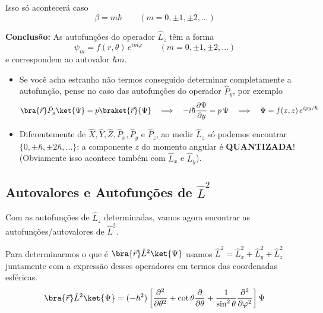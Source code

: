 Isso só acontecerá caso
\begin{equation}
    \beta = m\hbar \qquad (m = 0, \pm 1, \pm 2, \dots)
\label{eq:aula19_beta_quantizado}
\end{equation}

\textbf{Conclusão:} As autofunções do operador $\hat{L}_z$ têm a forma
\begin{equation}
    \boxed{\psi_m = f(r,\theta) \, e^{im\varphi} \qquad (m = 0, \pm 1, \pm 2, \dots)}
\label{eq:aula19_autofuncoes_Lz}
\end{equation}
e correspondem ao autovalor $\boxed{\hbar m}$.

\begin{itemize}
    \item Se você acha estranho não termos conseguido determinar completamente a autofunção, pense no caso das autofunções do operador $\hat{P}_y$, por exemplo
    \begin{equation}
        \bra{\vec{r}}\hat{P}_y\ket{\Psi} = p\braket{\vec{r}}{\Psi}
        \quad \Longrightarrow \quad
        -i\hbar \frac{\partial \Psi}{\partial y} = p\,\Psi
        \quad \Longrightarrow \quad
        \Psi = f(x,z)\, e^{ipy/\hbar}
    \label{eq:aula19_Py_autofuncao}
    \end{equation}
    \item Diferentemente de $\hat{X}, \hat{Y}, \hat{Z}, \hat{P}_x, \hat{P}_y$ e $\hat{P}_z$, ao medir $\hat{L}_z$ só podemos encontrar $\{0, \pm\hbar, \pm2\hbar, \dots\}$: a componente $z$ do momento angular é \textbf{QUANTIZADA}! (Obviamente isso acontece também com $\hat{L}_x$ e $\hat{L}_y$).
\end{itemize}

\subsection*{Autovalores e Autofunções de $\hat{L}^2$}

Com as autofunções de $\hat{L}_z$ determinadas, vamos agora encontrar as autofunções/autovalores de $\hat{L}^2$.

Para determinarmos o que é $\bra{\vec{r}}\hat{L}^2\ket{\Psi}$ usamos $\hat{L}^2 = \hat{L}_x^2 + \hat{L}_y^2 + \hat{L}_z^2$ juntamente com a expressão desses operadores em termos das coordenadas esféricas.
\begin{equation}
    \bra{\vec{r}}\hat{L}^2\ket{\Psi} = (-\hbar^2)\left[ \frac{\partial^2}{\partial \theta^2} + \cot\theta \frac{\partial}{\partial \theta} + \frac{1}{\sin^2\theta}\frac{\partial^2}{\partial \varphi^2} \right]\Psi
\label{eq:aula19_L2_esferica}
\end{equation}

